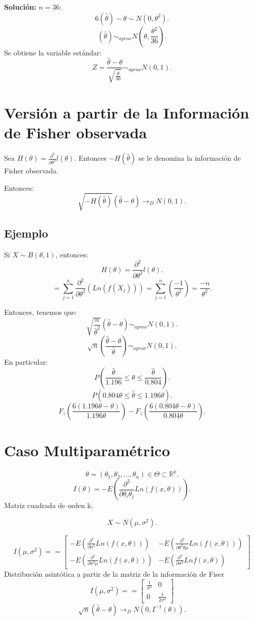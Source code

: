 \documentclass{article}
\begin{document}
\textbf{Solución: } $n=36$:
\[ 6{(\hat{\theta})-\theta}\sim N{(0,\theta^{2})}.\]
\[ {(\hat{\theta})}\sim_{aprox} N{(\theta,\frac{\theta^{2}}{36})}.\]
Se obtiene la variable estándar:
\[ Z=\frac{\hat{\theta}-\theta}{\sqrt{\frac{\hat{\theta}}{36}}}\sim_{aprox} N{(0,1)}.\]

\section{Versión a partir de la Información de Fisher observada}

Sea $H{(\theta)}=\frac{\partial^{2}}{\partial \theta^{2}}l{(\theta)}$. Entonces $-H{(\hat{\theta})}$ se le denomina la información de Fisher observada.

Entonces:
\[ \sqrt{-H{(\hat{\theta})}}{(\hat{\theta}-\theta)} \rightarrow_{D} N{(0,1)}.\]

\subsection{Ejemplo}

Si $X\sim B{(\theta,1)}$, entonces:
\[ H{(\theta)}=\frac{\partial^{2}}{\partial \theta^{2}}l{(\theta)}.\]
\[ = \sum_{j=1}^{n}\frac{\partial^{2}}{\partial \theta^{2}}{(Ln{(f{(X_{j})})})}= \sum_{j=1}^{n}{(\frac{-1}{\theta^{2}})}=\frac{-n}{\theta^{2}}.\]

Entonces, tenemos que:
\[ \sqrt{\frac{n}{\hat{\theta}^{2}}}{(\hat{\theta}-\theta)}\sim_{aprox} N{(0,1)}.\]
\[ \sqrt{n}{(\frac{\hat{\theta}-\theta}{\hat{\theta}})}\sim_{aprox} N{(0,1)}.\]
En particular:
\[ P{(\frac{\hat{\theta}}{1.196} \leq \theta \leq\frac{\hat{\theta}}{0.804})}.\]
\[ P{(0.804 \theta \leq \hat{\theta} \leq 1.196\theta)}.\]
\[ F_{z}{(\frac{6{(1.196\theta-\theta)}}{1.196\theta})} - F_{z}{(\frac{6{(0.804\theta-\theta)}}{0.804\theta})} .\]

\section{Caso Multiparamétrico}

\[ \theta = (\theta_{1},\theta_{2},\ldots,\theta_{n}) \in \Theta \subset \mathbb{R}^{k}.\]
\[ I{(\theta)}=-E{(\frac{\partial^{2}}{\partial \theta_{i}\theta_{j}} Ln{(f{(x,\theta)})})}.\]
Matriz cuadrada de orden k.

\[ X\sim N{(\mu,\sigma^{2})}.\]

\[ I{(\mu,\sigma^{2})}= 
= 
\begin{bmatrix}
	-E{(\frac{\partial^{2}}{\partial \mu^{2}}Ln{(f{(x,\theta)})})}& -E{(\frac{\partial^{2}}{\partial \theta^{2}\theta\mu} Ln{(f{(x,\theta)})})} \\
	-E{(\frac{\partial^{2}}{\partial \sigma^{2}\mu} Ln{(f{(x,\theta)})})} & -E{(\frac{\partial^{2}}{\partial \sigma^{2}}Ln f{(x,\theta)})}
\end{bmatrix}
\]
Distribución asintótica a partir de la matriz de la información de Fiser
\[ I{(\mu,\sigma^{2})}=
= 
\begin{bmatrix}
\frac{1}{\sigma^{2}} & 0 \\
0 & \frac{1}{2\sigma^{4}} 
\end{bmatrix}
\]
\[ \sqrt{n}{(\hat{\theta}-\theta)} \rightarrow_{D} N{(0,I^{-1}{(\theta)})}.\]
\end{document}

